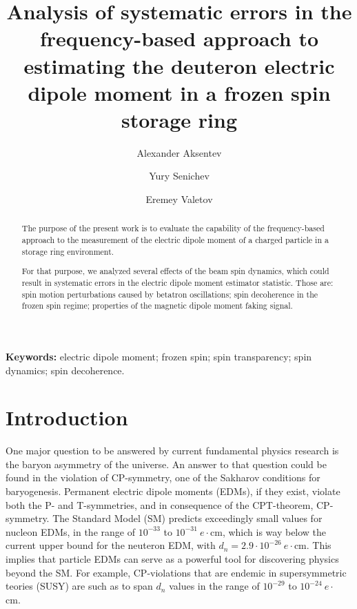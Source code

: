 \documentclass[]{elsarticle}
\begin{document}
\title{Analysis of systematic errors in the frequency-based approach to estimating
  the deuteron electric dipole moment in a frozen spin storage ring}

\author[FZJ,INR,MEPHI]{Alexander Aksentev}

\author[INR]{Yury Senichev}

\author[MSU]{Eremey Valetov}


\address[FZJ]{Institut f\"ur Kernphysik (IKP-2), Forschungszentrum J\"ulich,
  J\"ulich, Germany}
\address[INR]{Institute for Nuclear Research of the Russian Academy of Sciences,
  Moscow, Russia}
\address[MEPHI]{National Research Nuclear University ``MEPhI,''
  Moscow, Russia}
\address[MSU]{Department of Physics and Astronomy, Michigan State University,
  MI 48824, USA}


\begin{abstract}
  The purpose of the present work is to evaluate the capability of the frequency-based approach
  to the measurement of the electric dipole moment of a charged particle in a storage ring environment.

  For that purpose, we analyzed several effects of the beam spin dynamics, which could result in systematic
  errors in the electric dipole moment estimator statistic. Those are: spin motion perturbations caused by
  betatron oscillations; spin decoherence in the frozen spin regime; properties of the magnetic dipole
  moment faking signal.
\end{abstract}


\maketitle

\textbf{Keywords:} electric dipole moment; frozen spin; spin transparency; spin dynamics; spin decoherence.


\section{Introduction}
One major question to be answered by current fundamental physics research is
the baryon asymmetry of the universe.
An answer to that question could be found in the violation of CP-symmetry, one
of the Sakharov conditions for baryogenesis. Permanent electric dipole moments (EDMs), if they exist,
violate both the P- and T-symmetries, and in consequence of the CPT-theorem, CP-symmetry.
The Standard Model (SM) predicts exceedingly small values for nucleon EDMs,
in the range of $10^{-33}$ to $10^{-31}~e\cdot$cm,
which is way below the current upper bound for the neuteron EDM,
with $d_n = 2.9\cdot 10^{-26}~e\cdot$cm. This implies that particle EDMs can serve as a powerful tool
for discovering physics beyond the SM. For example, CP-violations that are endemic in
supersymmetric teories (SUSY) are such as to span $d_n$ values in the range of
$10^{-29}$ to $10^{-24}~e\cdot$cm.~\cite{JEDI}
\end{document}
